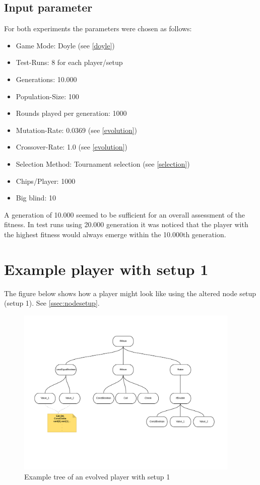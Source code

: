 \documentclass[12pt,fleqn,a4paper]{article}
\begin{document}
\subsection{Input parameter}
\label{inputparameter}
For both experiments the parameters were chosen as follows: 
\begin{itemize}
	\item Game Mode: Doyle (see \ref{doyle})
	\item Test-Runs: 8 for each player/setup
	\item Generations: 10.000
	\item Population-Size: 100
	\item Rounds played per generation: 1000
	\item Mutation-Rate: 0.0369 (see \ref{evolution})
	\item Crossover-Rate: 1.0 (see \ref{evolution})
	\item Selection Method: Tournament selection (see \ref{selection})
	\item Chips/Player: 1000 
	\item Big blind: 10
\end{itemize} 
A generation of 10.000 seemed to be sufficient for an overall assessment of the fitness. In test runs using 20.000 generation it was noticed that
the player with the highest fitness would always emerge within the 10.000th generation.

\section{Example player with setup 1}
The figure below shows how a player might look like using the altered node setup (setup 1). See \ref{ssec:nodesetup}.
\begin{figure}[!ht]
	\begin{center}
		\includegraphics[width=0.95\textwidth]{NewRaise.png}
		\caption{Example tree of an evolved player with setup 1}
		\end{center}
		\end{figure}
\end{document}
